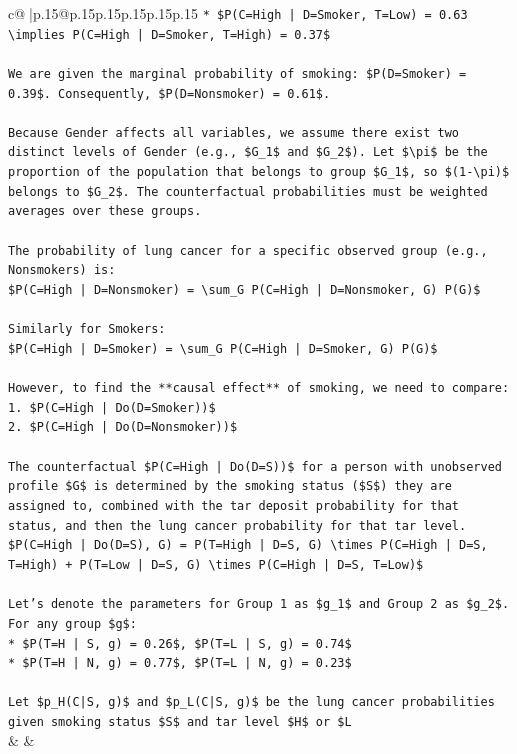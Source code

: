 \documentclass{article}
\begin{document}
{\begin{supertabular}{c@{$\;$}|p{.15\linewidth}@{}p{.15\linewidth}p{.15\linewidth}p{.15\linewidth}p{.15\linewidth}p{.15\linewidth}}
{{{\texttt{*   \$P(C=High | D=Smoker, T=Low) = 0.63 \textbackslash{}implies P(C=High | D=Smoker, T=High) = 0.37\$} \\
\\ 
\texttt{We are given the marginal probability of smoking: \$P(D=Smoker) = 0.39\$. Consequently, \$P(D=Nonsmoker) = 0.61\$.} \\
\\ 
\texttt{Because Gender affects all variables, we assume there exist two distinct levels of Gender (e.g., \$G\_1\$ and \$G\_2\$). Let \$\textbackslash{}pi\$ be the proportion of the population that belongs to group \$G\_1\$, so \$(1{-}\textbackslash{}pi)\$ belongs to \$G\_2\$. The counterfactual probabilities must be weighted averages over these groups.} \\
\\ 
\texttt{The probability of lung cancer for a specific observed group (e.g., Nonsmokers) is:} \\
\texttt{\$P(C=High | D=Nonsmoker) = \textbackslash{}sum\_G P(C=High | D=Nonsmoker, G) P(G)\$} \\
\\ 
\texttt{Similarly for Smokers:} \\
\texttt{\$P(C=High | D=Smoker) = \textbackslash{}sum\_G P(C=High | D=Smoker, G) P(G)\$} \\
\\ 
\texttt{However, to find the **causal effect** of smoking, we need to compare:} \\
\texttt{1.  \$P(C=High | Do(D=Smoker))\$} \\
\texttt{2.  \$P(C=High | Do(D=Nonsmoker))\$} \\
\\ 
\texttt{The counterfactual \$P(C=High | Do(D=S))\$ for a person with unobserved profile \$G\$ is determined by the smoking status (\$S\$) they are assigned to, combined with the tar deposit probability for that status, and then the lung cancer probability for that tar level.} \\
\texttt{\$P(C=High | Do(D=S), G) = P(T=High | D=S, G) \textbackslash{}times P(C=High | D=S, T=High) + P(T=Low | D=S, G) \textbackslash{}times P(C=High | D=S, T=Low)\$} \\
\\ 
\texttt{Let's denote the parameters for Group 1 as \$g\_1\$ and Group 2 as \$g\_2\$.} \\
\texttt{For any group \$g\$:} \\
\texttt{*   \$P(T=H | S, g) = 0.26\$, \$P(T=L | S, g) = 0.74\$} \\
\texttt{*   \$P(T=H | N, g) = 0.77\$, \$P(T=L | N, g) = 0.23\$} \\
\\ 
\texttt{Let \$p\_H(C|S, g)\$ and \$p\_L(C|S, g)\$ be the lung cancer probabilities given smoking status \$S\$ and tar level \$H\$ or \$L} \\
            }
        }
    }
    & & \\ \\


\end{supertabular}}
\end{document}
